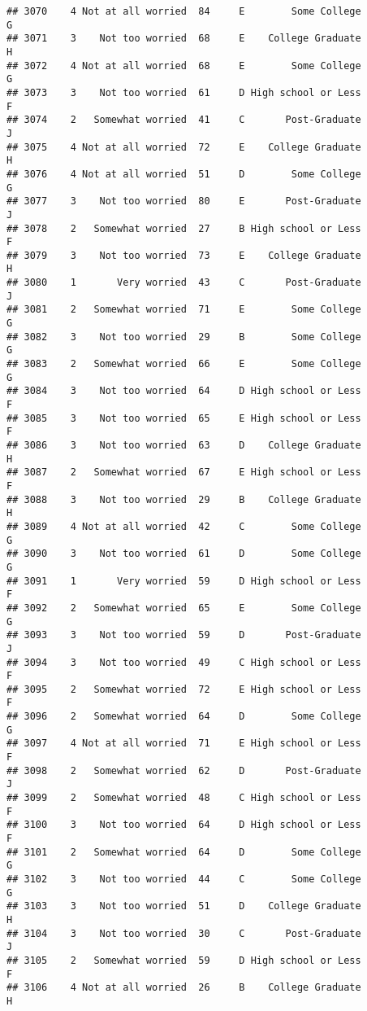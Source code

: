 \documentclass[
]{article}
\begin{document}
\begin{verbatim}
## 3070    4 Not at all worried  84     E        Some College         G
## 3071    3    Not too worried  68     E    College Graduate         H
## 3072    4 Not at all worried  68     E        Some College         G
## 3073    3    Not too worried  61     D High school or Less         F
## 3074    2   Somewhat worried  41     C       Post-Graduate         J
## 3075    4 Not at all worried  72     E    College Graduate         H
## 3076    4 Not at all worried  51     D        Some College         G
## 3077    3    Not too worried  80     E       Post-Graduate         J
## 3078    2   Somewhat worried  27     B High school or Less         F
## 3079    3    Not too worried  73     E    College Graduate         H
## 3080    1       Very worried  43     C       Post-Graduate         J
## 3081    2   Somewhat worried  71     E        Some College         G
## 3082    3    Not too worried  29     B        Some College         G
## 3083    2   Somewhat worried  66     E        Some College         G
## 3084    3    Not too worried  64     D High school or Less         F
## 3085    3    Not too worried  65     E High school or Less         F
## 3086    3    Not too worried  63     D    College Graduate         H
## 3087    2   Somewhat worried  67     E High school or Less         F
## 3088    3    Not too worried  29     B    College Graduate         H
## 3089    4 Not at all worried  42     C        Some College         G
## 3090    3    Not too worried  61     D        Some College         G
## 3091    1       Very worried  59     D High school or Less         F
## 3092    2   Somewhat worried  65     E        Some College         G
## 3093    3    Not too worried  59     D       Post-Graduate         J
## 3094    3    Not too worried  49     C High school or Less         F
## 3095    2   Somewhat worried  72     E High school or Less         F
## 3096    2   Somewhat worried  64     D        Some College         G
## 3097    4 Not at all worried  71     E High school or Less         F
## 3098    2   Somewhat worried  62     D       Post-Graduate         J
## 3099    2   Somewhat worried  48     C High school or Less         F
## 3100    3    Not too worried  64     D High school or Less         F
## 3101    2   Somewhat worried  64     D        Some College         G
## 3102    3    Not too worried  44     C        Some College         G
## 3103    3    Not too worried  51     D    College Graduate         H
## 3104    3    Not too worried  30     C       Post-Graduate         J
## 3105    2   Somewhat worried  59     D High school or Less         F
## 3106    4 Not at all worried  26     B    College Graduate         H

\end{verbatim}
\end{document}
